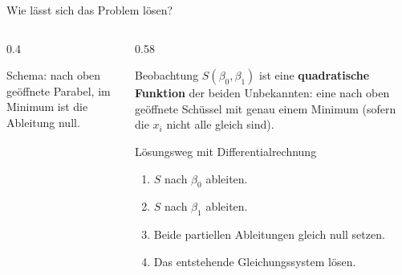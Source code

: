 \documentclass[aspectratio=169,11pt]{beamer}
\begin{document}
\begin{frame}{Wie lässt sich das Problem lösen?}
  \begin{columns}[T]
    \begin{column}{0.4\textwidth}
      \begin{center}\footnotesize
        Schema: nach oben geöffnete Parabel, im Minimum ist die Ableitung null.
      \end{center}
    \end{column}
    \begin{column}{0.58\textwidth}
      \begin{block}{Beobachtung}
        $S(\beta_0,\beta_1)$ ist eine \textbf{quadratische Funktion} der beiden
        Unbekannten: eine nach oben geöffnete \glqq Schüssel\grqq{} mit genau
        einem Minimum (sofern die $x_i$ nicht alle gleich sind).
      \end{block}
      \begin{block}{Lösungsweg mit Differentialrechnung}
        \begin{enumerate}
          \item $S$ nach $\beta_0$ ableiten.
          \item $S$ nach $\beta_1$ ableiten.
          \item Beide partiellen Ableitungen gleich null setzen.
          \item Das entstehende Gleichungssystem lösen.
        \end{enumerate}
      \end{block}
    \end{column}
  \end{columns}
\end{frame}
\end{document}
